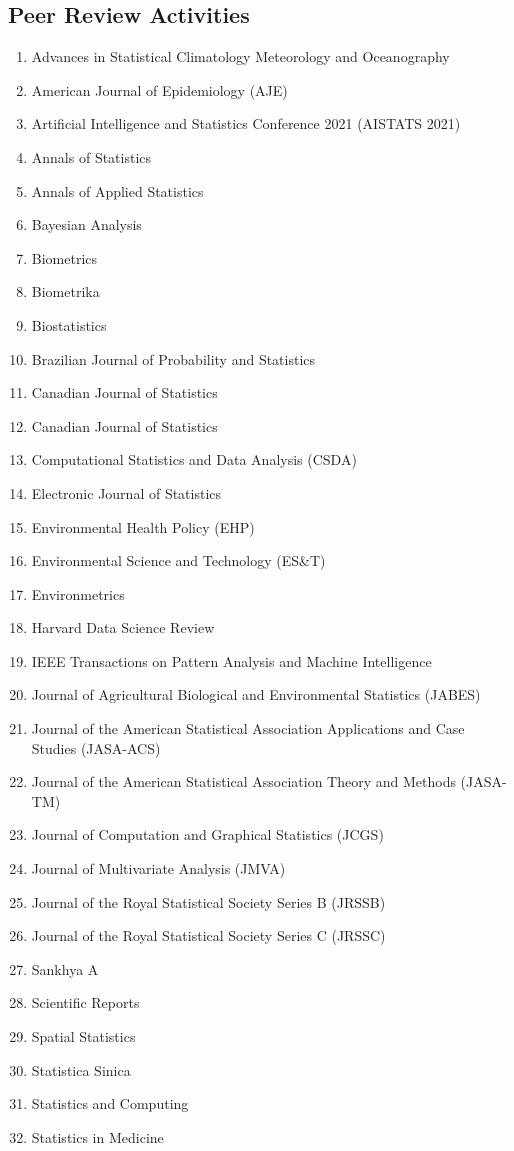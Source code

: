 \documentclass[12pt]{article}
\begin{document}
\subsection*{Peer Review Activities} %
\begin{enumerate}
	\item Advances in Statistical Climatology Meteorology and Oceanography %
	\item American Journal of Epidemiology (AJE) %
	\item  Artificial Intelligence and Statistics Conference 2021 (AISTATS 2021) %
	\item Annals of Statistics %
	\item Annals of Applied Statistics %
	\item Bayesian Analysis %
	\item Biometrics %
	\item Biometrika %
	\item Biostatistics %
	\item Brazilian Journal of Probability and Statistics %
	\item Canadian Journal of Statistics %
	\item Canadian Journal of Statistics %
	\item Computational Statistics and Data Analysis (CSDA) %
	\item Electronic Journal of Statistics %
	\item Environmental Health Policy (EHP) %
	\item Environmental Science and Technology (ES\&T) %
	\item Environmetrics %
	\item Harvard Data Science Review %
	\item IEEE Transactions on Pattern Analysis and Machine Intelligence %
	\item Journal of Agricultural Biological and Environmental Statistics (JABES) %
	\item Journal of the American Statistical Association Applications and Case Studies (JASA-ACS) %
	\item Journal of the American Statistical Association Theory and Methods (JASA-TM) %
	\item Journal of Computation and Graphical Statistics (JCGS) %
	\item Journal of Multivariate Analysis (JMVA) %
	\item Journal of the Royal Statistical Society Series B (JRSSB) %
	\item Journal of the Royal Statistical Society Series C (JRSSC) %
	\item Sankhya A %
	\item Scientific Reports %
	\item Spatial Statistics %
	\item Statistica Sinica %
	\item Statistics and Computing %
	\item Statistics in Medicine %
\end{enumerate}
\end{document}
